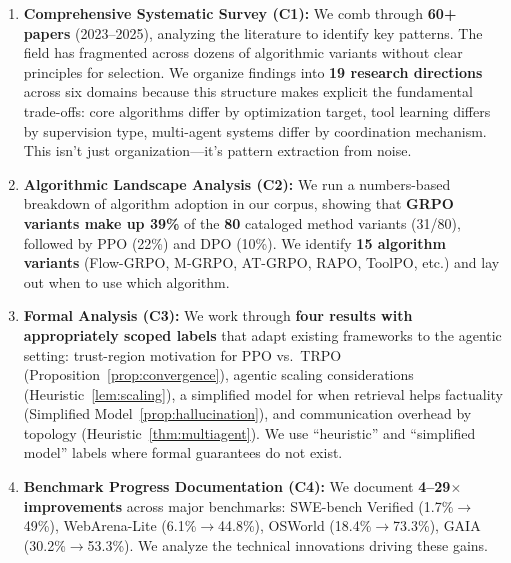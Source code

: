 \documentclass[12pt,a4paper]{report}
\theoremstyle{definition}
\newcommand{\methodN}{80}
\begin{document}
\begin{enumerate}
    \item \textbf{Comprehensive Systematic Survey (C1):} We comb through \textbf{60+ papers} (2023--2025), analyzing the literature to identify key patterns. The field has fragmented across dozens of algorithmic variants without clear principles for selection. We organize findings into \textbf{19 research directions} across six domains because this structure makes explicit the fundamental trade-offs: core algorithms differ by optimization target, tool learning differs by supervision type, multi-agent systems differ by coordination mechanism. This isn't just organization—it's pattern extraction from noise.

    \item \textbf{Algorithmic Landscape Analysis (C2):} We run a numbers-based breakdown of algorithm adoption in our corpus, showing that \textbf{GRPO variants make up 39\%} of the \textbf{\methodN} cataloged method variants (31/\methodN), followed by PPO (22\%) and DPO (10\%). We identify \textbf{15 algorithm variants} (Flow-GRPO, M-GRPO, AT-GRPO, RAPO, ToolPO, etc.) and lay out when to use which algorithm.

    \item \textbf{Formal Analysis (C3):} We work through \textbf{four results with appropriately scoped labels} that adapt existing frameworks to the agentic setting: trust-region motivation for PPO vs.\ TRPO (Proposition~\ref{prop:convergence}), agentic scaling considerations (Heuristic~\ref{lem:scaling}), a simplified model for when retrieval helps factuality (Simplified Model~\ref{prop:hallucination}), and communication overhead by topology (Heuristic~\ref{thm:multiagent}). We use ``heuristic'' and ``simplified model'' labels where formal guarantees do not exist.

    \item \textbf{Benchmark Progress Documentation (C4):} We document \textbf{4--29$\times$ improvements} across major benchmarks: SWE-bench Verified (1.7\%$\rightarrow$49\%), WebArena-Lite (6.1\%$\rightarrow$44.8\%), OSWorld (18.4\%$\rightarrow$73.3\%), GAIA (30.2\%$\rightarrow$53.3\%). We analyze the technical innovations driving these gains.


\end{enumerate}
\end{document}
